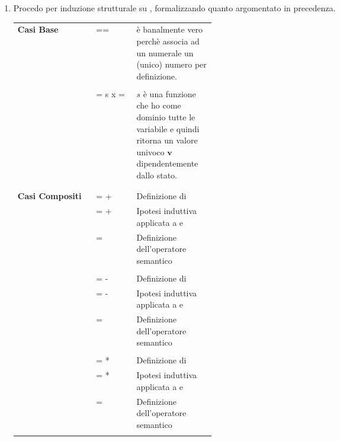 {\begin{enumerate}
\begin{itemize}
			
		\end{itemize}
			\item Procedo per induzione strutturale su \aexp, formalizzando quanto argomentato
			in precedenza.
			\begin{table}[h!]
				\begin{center}
			\begin{tabular}{| l| L | p{0.4\linewidth} |}
				\hline
				\textbf{Casi Base} & == & 
				è banalmente vero perchè \Ncal associa ad un numerale un (unico) numero per definizione.\\
				& &\\
				&  = s \myspace x = &$s$ è una funzione che ho come dominio tutte le variabile e quindi ritorna un valore univoco $\mathbf{v}$ dipendentemente dallo stato.\\
				& & \\
				\hline
				& &\\
				\textbf{Casi Compositi} &  =  +  & Definizione di \\
				& =  +   &  Ipotesi induttiva applicata a  e \\
				& =  & Definizione dell'operatore semantico\\
				& & \\
				&  =  -  & Definizione di \\
				& =  -   &  Ipotesi induttiva applicata a  e \\
				& =  & Definizione dell'operatore semantico\\
				& & \\
				&  =  *  & Definizione di \\
				& =  *   & Ipotesi induttiva applicata a  e \\
				& =  & Definizione dell'operatore semantico\\
				& & \\
				\hline
			\end{tabular}
				
				\end{center}
			\end{table}
			
	\end{enumerate}
}
